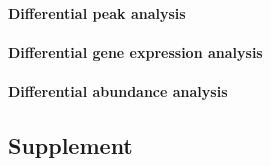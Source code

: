 \paragraph{Differential peak analysis}

\paragraph{Differential gene expression analysis}

\paragraph{Differential abundance analysis}









\clearpage

\subsection{Supplement}
\beginsupplement

